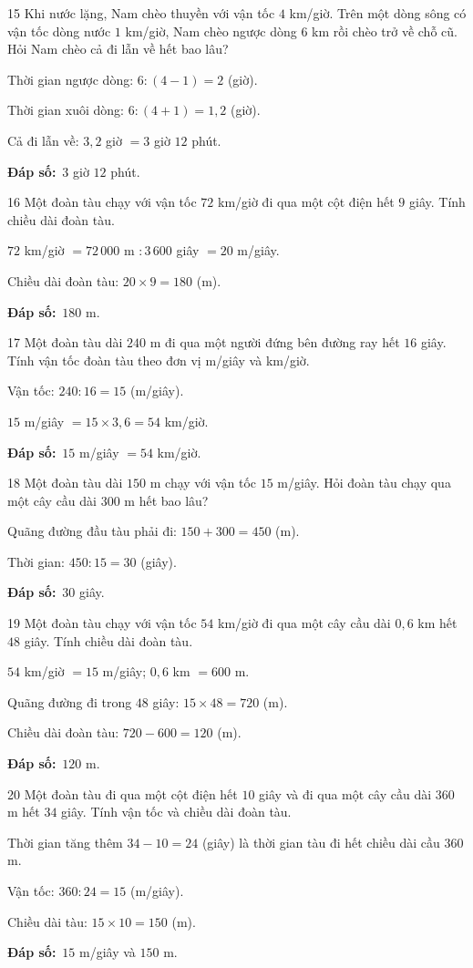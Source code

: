 \documentclass[11pt]{article}
\newif\ifsol \solfalse
\providecommand{\AnsWord}{Đáp số}
\newcommand{\dapso}[1]{\par\textbf{\AnsWord:}\ #1}
\newcommand{\probsol}[1]{%
  \begin{lrbox}{\solmeasure}\begin{minipage}{\dimexpr\linewidth-24pt\relax}#1\end{minipage}\end{lrbox}%
  \ifsol
    \begin{solbox}#1\end{solbox}%
  \else
    \setlength{\solht}{\dimexpr\ht\solmeasure+\dp\solmeasure+0.85cm\relax}%
    \ifdim\solht<1.35cm\setlength{\solht}{1.35cm}\fi
    \begin{tcolorbox}[colback=white,colframe=Line,boxrule=0.8pt,arc=5pt,
      left=8pt,right=8pt,top=4pt,bottom=4pt,height=\solht]{\footnotesize\color{Slate}\itshape\WorkWord}\end{tcolorbox}%
  \fi}
\newcommand{\gap}{\vspace{0.3cm}}
\def\WorkWord{Bài làm:}
\def\AnsWord{Đáp số}
\begin{document}
\gap
\begin{probbox}{15}{\relax}
Khi nước lặng, Nam chèo thuyền với vận tốc $4$ km/giờ. Trên một dòng sông có vận tốc dòng nước $1$ km/giờ, Nam chèo ngược dòng $6$ km rồi chèo trở về chỗ cũ. Hỏi Nam chèo cả đi lẫn về hết bao lâu?
\end{probbox}
\probsol{
Thời gian ngược dòng: $6:(4-1)=2$ (giờ).\par Thời gian xuôi dòng: $6:(4+1)=1{,}2$ (giờ).\par Cả đi lẫn về: $3{,}2$ giờ $=3$ giờ $12$ phút.
\dapso{$3$ giờ $12$ phút.}}
\gap
\begin{probbox}{16}{\relax}
Một đoàn tàu chạy với vận tốc $72$ km/giờ đi qua một cột điện hết $9$ giây. Tính chiều dài đoàn tàu.
\end{probbox}
\probsol{
$72$ km/giờ $=72\,000$ m $:3\,600$ giây $=20$ m/giây.\par Chiều dài đoàn tàu: $20\times9=180$ (m).
\dapso{$180$ m.}}
\gap
\begin{probbox}{17}{\relax}
Một đoàn tàu dài $240$ m đi qua một người đứng bên đường ray hết $16$ giây. Tính vận tốc đoàn tàu theo đơn vị m/giây và km/giờ.
\end{probbox}
\probsol{
Vận tốc: $240:16=15$ (m/giây).\par $15$ m/giây $=15\times3{,}6=54$ km/giờ.
\dapso{$15$ m/giây $=54$ km/giờ.}}
\gap
\begin{probbox}{18}{\relax}
Một đoàn tàu dài $150$ m chạy với vận tốc $15$ m/giây. Hỏi đoàn tàu chạy qua một cây cầu dài $300$ m hết bao lâu?
\end{probbox}
\probsol{
Quãng đường đầu tàu phải đi: $150+300=450$ (m).\par Thời gian: $450:15=30$ (giây).
\dapso{$30$ giây.}}
\gap
\begin{probbox}{19}{\relax}
Một đoàn tàu chạy với vận tốc $54$ km/giờ đi qua một cây cầu dài $0{,}6$ km hết $48$ giây. Tính chiều dài đoàn tàu.
\end{probbox}
\probsol{
$54$ km/giờ $=15$ m/giây; $0{,}6$ km $=600$ m.\par Quãng đường đi trong $48$ giây: $15\times48=720$ (m).\par Chiều dài đoàn tàu: $720-600=120$ (m).
\dapso{$120$ m.}}
\gap
\begin{probbox}{20}{\relax}
Một đoàn tàu đi qua một cột điện hết $10$ giây và đi qua một cây cầu dài $360$ m hết $34$ giây. Tính vận tốc và chiều dài đoàn tàu.
\end{probbox}
\probsol{
Thời gian tăng thêm $34-10=24$ (giây) là thời gian tàu đi hết chiều dài cầu $360$ m.\par
Vận tốc: $360:24=15$ (m/giây).\par Chiều dài tàu: $15\times10=150$ (m).
\dapso{$15$ m/giây và $150$ m.}}
\end{document}
